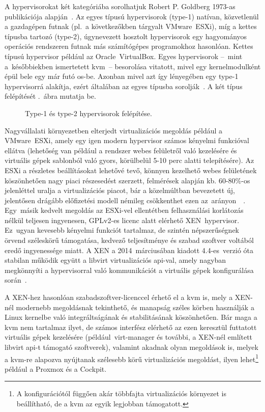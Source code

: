 A \gls{hypervisor}okat két kategóriába sorolhatjuk Robert P. Goldberg 1973-as publikációja alapján~\cite{Goldberg1973Hypervisors}. Az egyes típusú hypervisorok \mbox{(type-1)} natívan, közvetlenül a gazdagépen futnak (pl.~a következőkben tárgyalt VMware~ESXi), míg a kettes típusba tartozó \mbox{(type-2)}, úgynevezett hosztolt hypervisorok egy hagyományos operációs rendszeren futnak más számítógépes programokhoz hasonlóan. Kettes típusú hypervisor például az Oracle~\mbox{VirtualBox}. Egyes hypervisorok --~mint a~későbbiekben ismertetett \acrshort{kvm}~-- besorolása vitatott, mivel egy kernelmodulként épül bele egy már futó \acrshort{os}-be. Azonban mivel azt így lényegében egy type-1 \gls{hypervisor}rá alakítja, ezért általában az egyes típusba sorolják~\cite{WikiHypervisor}. A két típus felépítését .~ábra mutatja be.

\begin{figure}[ht]
	\centering
	
	\caption{Type-1 és type-2 \gls{hypervisor}ok felépítése.}
	\label{fig:hypervisors}
\end{figure}

Nagyvállalati környezetben elterjedt virtualizációs megoldás például a VMware~ESXi, amely egy igen modern \gls{hypervisor} számos kényelmi funkcióval ellátva (lehetőség van például a rendszer webes felületről való kezelésére és virtuális gépek sablonból való gyors, körülbelül 5-10 perc alatti telepítésére). Az ESXi a részletes beállításokat lehetővé tevő, könnyen kezelhető webes felületének köszönhetően nagy piaci részesedést szerzett, felmérések alapján kb. 60-80\%-os jelenléttel uralja a virtualizációs piacot, bár a közelmúltban bevezetett új, jelentősen drágább előfizetési modell némileg csökkenthet ezen az~arányon~\cite{VmwareMarketshare}~\cite{VmwareCustomerDecline}.
Egy~másik kedvelt megoldás az ESXi-vel ellentétben felhasználási korlátozás nélkül teljesen ingyenesen, GPLv2-es licenc alatt elérhető XEN~\gls{hypervisor}. Ez~ugyan kevesebb kényelmi funkciót tartalmaz, de szintén népszerűségnek örvend széleskörű támogatása, kedvező teljesítménye és szabad szoftver voltából eredő ingyenessége miatt. A XEN a 2014~márciusában kiadott 4.4-es~verzió óta stabilan működik együtt a \gls{libvirt} virtualizációs \acrshort{api}-val, amely nagyban megkönnyíti a \gls{hypervisor}ral való kommunikációt a virtuális gépek konfigurálása során~\cite{Xen44ReleaseNotes}.

A XEN-hez hasonlóan szabadszoftver-licenccel érhető el a \acrfull{kvm} is, mely a XEN-nél modernebb megoldásnak tekinthető, és manapság széles körben használják a Linux kernelbe való integráltságának és stabilitásának köszönhetően. Bár maga a \acrshort{kvm} nem tartalmaz ilyet, de számos interfész elérhető az ezen keresztül futtatott virtuális gépek kezelésére (például~virt-manager és további, a XEN-nél említett \gls{libvirt} \acrshort{api}-t támogató  szoftverek), valamint akadnak olyan megoldások is, melyek a \acrshort{kvm}-re alapozva nyújtanak szélesebb körű virtualizációs megoldást, ilyen lehet\footnote{A konfigurációtól függően akár többfajta virtualizációs környezet is beállítható, de a \acrshort{kvm} az egyik legjobban támogatott.} például a Proxmox és a Cockpit.

